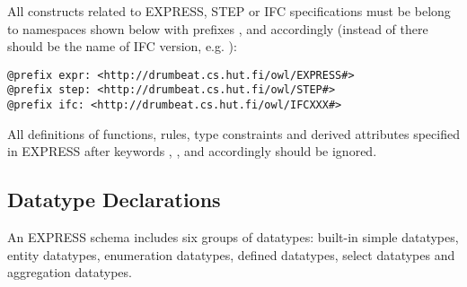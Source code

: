 \begin{principle}%
All constructs related to EXPRESS, STEP or IFC specifications must be belong to namespaces shown below with prefixes ,  and  accordingly (instead of  there should be the name of IFC version, e.g. ):

\begin{lstlisting}
@prefix expr: <http://drumbeat.cs.hut.fi/owl/EXPRESS#>
@prefix step: <http://drumbeat.cs.hut.fi/owl/STEP#>
@prefix ifc: <http://drumbeat.cs.hut.fi/owl/IFCXXX#>
\end{lstlisting}
\end{principle}

\begin{principle}All definitions of functions, rules, type constraints and derived attributes specified in EXPRESS after keywords , ,  and  accordingly should be ignored.
\end{principle}



\subsection{Datatype Declarations}
\label{subsec:ifcOWL-types}


An EXPRESS schema includes six groups of data\-types: built-in simple data\-types, entity data\-types, enumeration data\-types, defined data\-types, select data\-types and aggregation data\-types.



